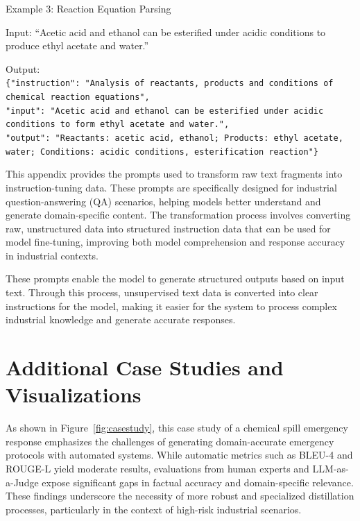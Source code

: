 \documentclass[preprint,12pt]{elsarticle}
\def\textbf#1{#1}%
\def\textit#1{#1}%
\begin{document}
\begin{tcolorbox}
    \medskip
    \noindent\textbf{Example 3: Reaction Equation Parsing}

    \noindent\textbf{Input:} \textit{``Acetic acid and ethanol can be esterified under acidic conditions to produce ethyl acetate and water.''}

    \noindent\textbf{Output:}\\
    \texttt{\{"instruction": "Analysis of reactants, products and conditions of chemical reaction equations",}\\
    \texttt{"input": "Acetic acid and ethanol can be esterified under acidic conditions to form ethyl acetate and water.",}\\
    \texttt{"output": "Reactants: acetic acid, ethanol; Products: ethyl acetate, water; Conditions: acidic conditions, esterification reaction"\}}
    \end{tcolorbox}
This appendix provides the prompts used to transform raw text fragments into instruction-tuning data. These prompts are specifically designed for industrial question-answering (QA) scenarios, helping models better understand and generate domain-specific content. The transformation process involves converting raw, unstructured data into structured instruction data that can be used for model fine-tuning, improving both model comprehension and response accuracy in industrial contexts.



These prompts enable the model to generate structured outputs based on input text. Through this process, unsupervised text data is converted into clear instructions for the model, making it easier for the system to process complex industrial knowledge and generate accurate responses.



\section{Additional Case Studies and Visualizations}

\label{sec:casestudy}
    


As shown in Figure~\ref{fig:casestudy}, this case study of a chemical spill emergency response emphasizes the challenges of generating domain-accurate emergency protocols with automated systems. While automatic metrics such as BLEU-4 and ROUGE-L yield moderate results, evaluations from human experts and LLM-as-a-Judge expose significant gaps in factual accuracy and domain-specific relevance. These findings underscore the necessity of more robust and specialized distillation processes, particularly in the context of high-risk industrial scenarios.
\end{document}
